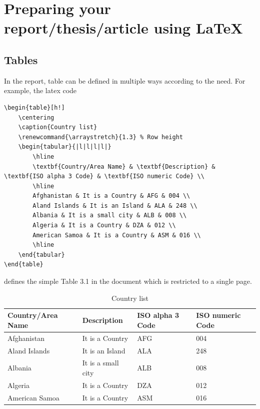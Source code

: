 \section{Preparing your report/thesis/article using \LaTeX}
\paragraph{}
\subsection{Tables}
In the report, table can be defined in multiple ways according to the need.  For example, the latex code
{\scriptsize
\begin{verbatim}
\begin{table}[h!]
	\centering
	\caption{Country list}
	\renewcommand{\arraystretch}{1.3} % Row height
	\begin{tabular}{|l|l|l|l|}
		\hline
		\textbf{Country/Area Name} & \textbf{Description} & \textbf{ISO alpha 3 Code} & \textbf{ISO numeric Code} \\
		\hline
		Afghanistan & It is a Country & AFG & 004 \\
		Aland Islands & It is an Island & ALA & 248 \\
		Albania & It is a small city & ALB & 008 \\
		Algeria & It is a Country & DZA & 012 \\
		American Samoa & It is a Country & ASM & 016 \\
		\hline
	\end{tabular}
\end{table}
\end{verbatim}
}
defines the simple Table 3.1 in the document which is restricted to a single page.
\begin{table}[h!]
\centering
\caption{Country list}
\renewcommand{\arraystretch}{1.3} %
\begin{tabular}{|l|l|l|l|}
\hline
\textbf{Country/Area Name} & \textbf{Description} & \textbf{ISO alpha 3 Code} & \textbf{ISO numeric Code} \\
\hline
Afghanistan & It is a Country & AFG & 004 \\
Aland Islands & It is an Island & ALA & 248 \\
Albania & It is a small city & ALB & 008 \\
Algeria & It is a Country & DZA & 012 \\
American Samoa & It is a Country & ASM & 016 \\
\hline
\end{tabular}
\end{table}


